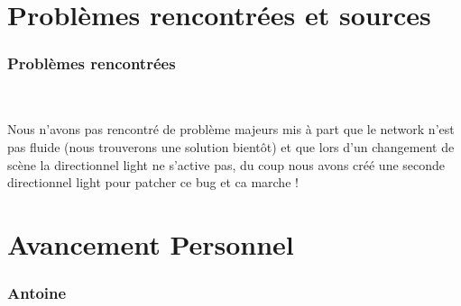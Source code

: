 \documentclass[titlepage, 13px, a4paper]{article}
\begin{document}
\newpage
\part{Problèmes rencontrées et sources }
\section{Problèmes rencontrées}
\paragraph{} \hspace{0pt} \\
Nous n'avons pas rencontré de problème majeurs mis à part que le network n'est pas fluide (nous trouverons une solution bientôt) 
et que lors d'un changement de scène la directionnel light ne s'active pas, du coup nous avons créé une seconde directionnel light pour patcher ce bug et ca marche !

\newpage




\part{Avancement Personnel}  
\section{Antoine}
\end{document}

